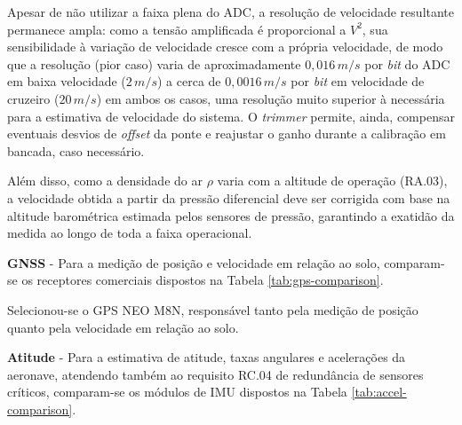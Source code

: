 Apesar de não utilizar a faixa plena do ADC, a resolução de velocidade resultante permanece ampla: como a tensão amplificada é proporcional a $V^2$, sua sensibilidade à variação de velocidade cresce com a própria velocidade, de modo que a resolução (pior caso) varia de aproximadamente $0,016\,m/s$ por \textit{bit} do ADC em baixa velocidade ($2\,m/s$) a cerca de $0,0016\,m/s$ por \textit{bit} em velocidade de cruzeiro ($20\,m/s$) em ambos os casos, uma resolução muito superior à necessária para a estimativa de velocidade do sistema. O \textit{trimmer} permite, ainda, compensar eventuais desvios de \textit{offset} da ponte e reajustar o ganho durante a calibração em bancada, caso necessário.

Além disso, como a densidade do ar $\rho$ varia com a altitude de operação (RA.03), a velocidade obtida a partir da pressão diferencial deve ser corrigida com base na altitude barométrica estimada pelos sensores de pressão, garantindo a exatidão da medida ao longo de toda a faixa operacional.

\textbf{GNSS} - Para a medição de posição e velocidade em relação ao solo, comparam-se os receptores comerciais dispostos na Tabela \ref{tab:gps-comparison}.
 
\begin{table}[H]
\centering
\caption{Sensores GNSS analisados.}
\caption*{Fonte: Produzido pelo autor.}
\label{tab:gps-comparison}
\end{table}

Selecionou-se o GPS NEO M8N, responsável tanto pela medição de posição quanto pela velocidade em relação ao solo.

\textbf{Atitude} - Para a estimativa de atitude, taxas angulares e acelerações da aeronave, atendendo também ao requisito RC.04 de redundância de sensores críticos, comparam-se os módulos de IMU dispostos na Tabela \ref{tab:accel-comparison}.

